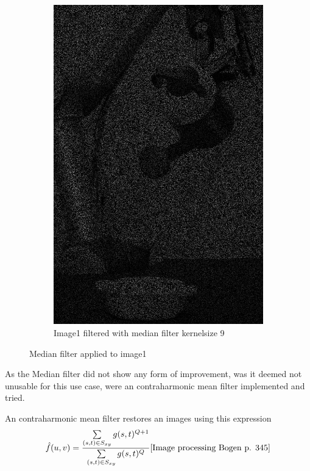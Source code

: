 \begin{figure}[H]
\begin{subfigure}[b]{0.27\textwidth}
        \includegraphics[width=\textwidth]{img1/img_1_medianBlur_9.png}
        \caption{Image1 filtered with median filter kernelsize 9}
        \label{fig:img1_median9}
    \end{subfigure}
    \caption{Median filter applied to image1}\label{fig:img_median_full}
\end{figure}

As the Median filter did not show  any form of improvement, was it  deemed not unusable for this use case, were an contraharmonic mean filter implemented and tried.  

An contraharmonic mean filter restores an images using this expression
\begin{equation}
\hat{f}(u,v) = \frac{\sum\limits_{(s,t) \in S_{xy}}g(s,t)^{Q+1}}{\sum\limits_{(s,t) \in S_{xy}}g(s,t)^{Q}}
\cite{Image processing Bogen p. 345}
\label{eq:Contra}
\end{equation}

